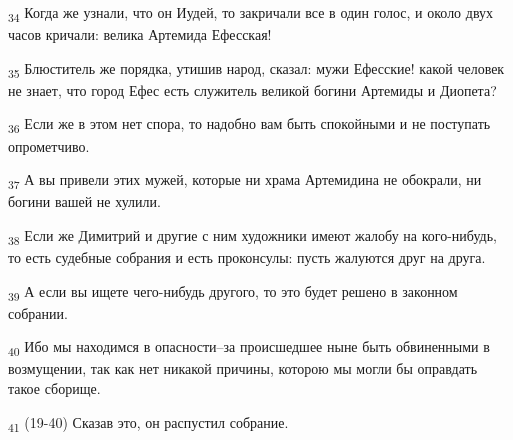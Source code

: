 \begin{tcolorbox}
\textsubscript{34} Когда же узнали, что он Иудей, то закричали все в один голос, и около двух часов кричали: велика Артемида Ефесская!
\end{tcolorbox}
\begin{tcolorbox}
\textsubscript{35} Блюститель же порядка, утишив народ, сказал: мужи Ефесские! какой человек не знает, что город Ефес есть служитель великой богини Артемиды и Диопета?
\end{tcolorbox}
\begin{tcolorbox}
\textsubscript{36} Если же в этом нет спора, то надобно вам быть спокойными и не поступать опрометчиво.
\end{tcolorbox}
\begin{tcolorbox}
\textsubscript{37} А вы привели этих мужей, которые ни храма Артемидина не обокрали, ни богини вашей не хулили.
\end{tcolorbox}
\begin{tcolorbox}
\textsubscript{38} Если же Димитрий и другие с ним художники имеют жалобу на кого-нибудь, то есть судебные собрания и есть проконсулы: пусть жалуются друг на друга.
\end{tcolorbox}
\begin{tcolorbox}
\textsubscript{39} А если вы ищете чего-нибудь другого, то это будет решено в законном собрании.
\end{tcolorbox}
\begin{tcolorbox}
\textsubscript{40} Ибо мы находимся в опасности--за происшедшее ныне быть обвиненными в возмущении, так как нет никакой причины, которою мы могли бы оправдать такое сборище.
\end{tcolorbox}
\begin{tcolorbox}
\textsubscript{41} (19-40) Сказав это, он распустил собрание.
\end{tcolorbox}
